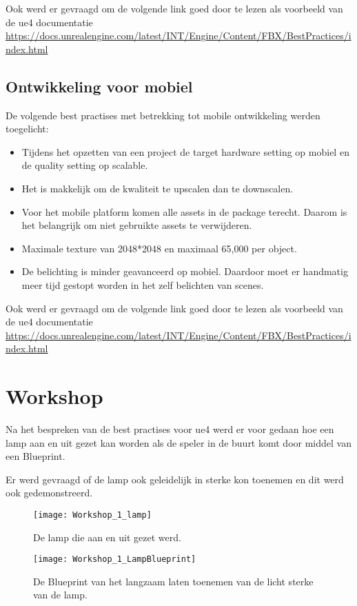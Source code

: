 Ook werd er gevraagd om de volgende link goed door te lezen als voorbeeld van de \gls{ue4} documentatie
\url{https://docs.unrealengine.com/latest/INT/Engine/Content/FBX/BestPractices/index.html}

\subsection{Ontwikkeling voor mobiel}
De volgende best practises met betrekking tot mobile ontwikkeling werden toegelicht:

\begin{itemize}
	\item Tijdens het opzetten van een project de target hardware setting op mobiel en de quality setting op scalable. 
	\item Het is makkelijk om de kwaliteit te upscalen dan te downscalen.
	\item Voor het mobile platform komen alle assets in de package terecht. Daarom is het belangrijk om niet gebruikte assets te verwijderen.
	\item Maximale texture van 2048*2048 en maximaal 65,000 per object.
	\item De belichting is minder geavanceerd op mobiel. Daardoor moet er handmatig meer tijd gestopt worden in het zelf belichten van scenes.
\end{itemize}

Ook werd er gevraagd om de volgende link goed door te lezen als voorbeeld van de \gls{ue4} documentatie
\url{https://docs.unrealengine.com/latest/INT/Engine/Content/FBX/BestPractices/index.html}

\section{Workshop}
Na het bespreken van de best practises voor \gls{ue4} werd er voor gedaan hoe een lamp aan en uit gezet kan worden als de speler in de buurt komt door middel van een Blueprint. 

Er werd gevraagd of de lamp ook geleidelijk in sterke kon toenemen en dit werd ook gedemonstreerd.

\begin{figure}[!ht]
  \centering
    \texttt{[image: Workshop\_1\_lamp]}
    \caption{De lamp die aan en uit gezet werd.}
\end{figure}

\begin{figure}[!ht]
  \centering
    \texttt{[image: Workshop\_1\_LampBlueprint]}
    \caption{De Blueprint van het langzaam laten toenemen van de licht sterke van de lamp.}
\end{figure}

